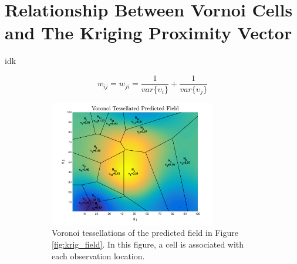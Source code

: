 \section{Relationship Between Vornoi Cells and The Kriging Proximity Vector}
idk

\begin{equation}
    w_{ij} = w_{ji} = \frac{1}{var\{\upsilon_i\}} + \frac{1}{var\{\upsilon_j\}}
\end{equation}

\begin{figure}[thpb]
\centering
    \begin{subfigure}[b]{\textwidth}
        \centering
        \includegraphics[width=0.8\textwidth]{./figures/natural_neighborhood_selection.png}
        \captionsetup{skip=0.0\baselineskip,size=footnotesize}
        \caption{Voronoi tessellations of the predicted field in Figure \ref{fig:krig_field}. In this figure, a cell is associated with each observation location.}
        \label{fig:nat_neigh}
    \end{subfigure}
    \\
    \begin{subfigure}[b]{\textwidth}

        \centering
\end{subfigure}
\end{figure}

